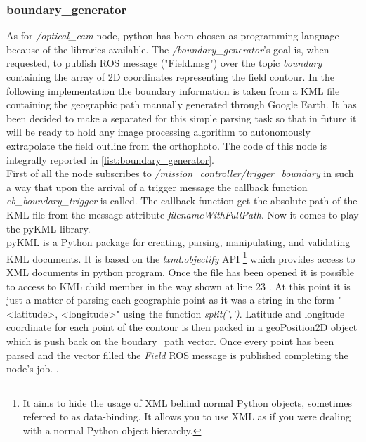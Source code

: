 \subsubsection{boundary\_generator} %
\label{ssub:boundary_generator}
As for \textit{/optical\_cam} node, python has been chosen as programming language because of the libraries available.
The \textit{/boundary\_generator}'s goal is, when requested, to publish ROS message ("Field.msg") over the topic \textit{boundary} containing the array of 2D coordinates representing the field contour.
In the following implementation the boundary information is taken from a KML file containing the geographic path manually generated through Google Earth. It has been decided to make a separated for this simple parsing task so that in future it will be ready to hold any image processing algorithm to autonomously extrapolate the field outline from the orthophoto.
The code of this node is integrally reported in \autoref{list:boundary_generator}.\\
First of all the node subscribes to \textit{/mission\_controller/trigger\_boundary} in such a way that upon the arrival of a trigger message the callback function \textit{cb\_boundary\_trigger} is called. The callback function get the absolute path of the KML file from the message attribute \textit{filenameWithFullPath}. Now it comes to play the pyKML library.\\
pyKML is a Python package for creating, parsing, manipulating, and validating KML documents. It is based on the \textit{lxml.objectify} API \footnote{It aims to hide the usage of XML behind normal Python objects, sometimes referred to as data-binding. It allows you to use XML as if you were dealing with a normal Python object hierarchy.\cite{lxml}} which provides access to XML documents in python program. Once the file has been opened it is possible to access to KML child member in the way shown at line 23 . At this point it is just a matter of parsing each geographic point as it was a string in the form "<latitude>, <longitude>" using the function \textit{split(',')}.
Latitude and longitude coordinate for each point of the contour is then packed in a geoPosition2D object which is push back on the boudary\_path vector. Once every point has been parsed and the vector filled the \textit{Field} ROS message is published completing the node's job.
.

